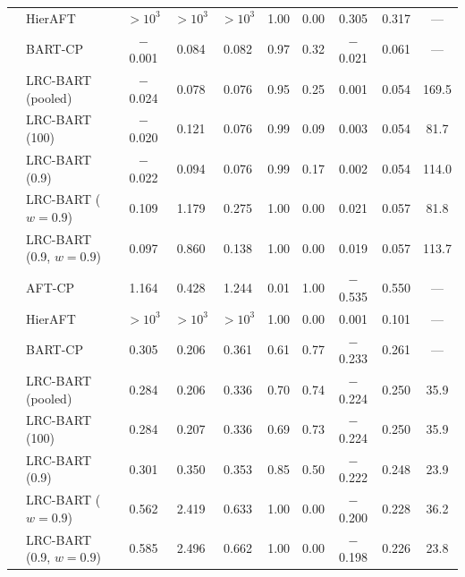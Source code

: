 \documentclass[11pt]{article}
\theoremstyle{definition}
\theoremstyle{plain}
\begin{document}
\begin{center}
\begin{longtable}{llcccccccc}
& HierAFT & $>\!10^{3}$ & $>\!10^{3}$ & $>\!10^{3}$ & 1.00 & 0.00 & 0.305 & 0.317 & --- \\
& BART-CP & $-$0.001 & 0.084 & 0.082 & 0.97 & 0.32 & $-$0.021 & 0.061 & --- \\
& LRC-BART (pooled) & $-$0.024 & 0.078 & 0.076 & 0.95 & 0.25 & 0.001 & 0.054 & 169.5 \\
& LRC-BART (100) & $-$0.020 & 0.121 & 0.076 & 0.99 & 0.09 & 0.003 & 0.054 & 81.7 \\
& LRC-BART (0.9) & $-$0.022 & 0.094 & 0.076 & 0.99 & 0.17 & 0.002 & 0.054 & 114.0 \\
& LRC-BART ($w=0.9$) & 0.109 & 1.179 & 0.275 & 1.00 & 0.00 & 0.021 & 0.057 & 81.8 \\
& LRC-BART (0.9, $w=0.9$) & 0.097 & 0.860 & 0.138 & 1.00 & 0.00 & 0.019 & 0.057 & 113.7 \\
\midrule
{} & AFT-CP & 1.164 & 0.428 & 1.244 & 0.01 & 1.00 & $-$0.535 & 0.550 & --- \\
& HierAFT & $>\!10^{3}$ & $>\!10^{3}$ & $>\!10^{3}$ & 1.00 & 0.00 & 0.001 & 0.101 & --- \\
& BART-CP & 0.305 & 0.206 & 0.361 & 0.61 & 0.77 & $-$0.233 & 0.261 & --- \\
& LRC-BART (pooled) & 0.284 & 0.206 & 0.336 & 0.70 & 0.74 & $-$0.224 & 0.250 & 35.9 \\
& LRC-BART (100) & 0.284 & 0.207 & 0.336 & 0.69 & 0.73 & $-$0.224 & 0.250 & 35.9 \\
& LRC-BART (0.9) & 0.301 & 0.350 & 0.353 & 0.85 & 0.50 & $-$0.222 & 0.248 & 23.9 \\
& LRC-BART ($w=0.9$) & 0.562 & 2.419 & 0.633 & 1.00 & 0.00 & $-$0.200 & 0.228 & 36.2 \\
& LRC-BART (0.9, $w=0.9$) & 0.585 & 2.496 & 0.662 & 1.00 & 0.00 & $-$0.198 & 0.226 & 23.8 \\
\end{longtable}
\end{center}
\end{document}
